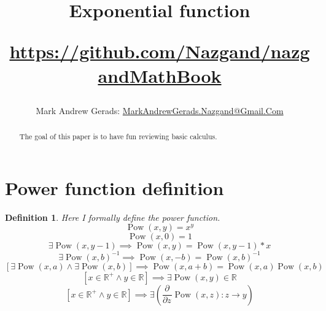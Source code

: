 \documentclass[]{article}
\author{Mark Andrew Gerads: \href{MailTo:MarkAndrewGerads.Nazgand@Gmail.Com}{MarkAndrewGerads.Nazgand@Gmail.Com}}
\title{
	Exponential function
	
	\href{https://github.com/Nazgand/nazgandMathBook}{https://github.com/Nazgand/nazgandMathBook}
}
\DeclareMathOperator{\pow}{Pow}
\newcommand{\pqty}[1]{{\left(#1\right)}}
\newcommand{\bqty}[1]{{\left[#1\right]}}
\newcommand{\pdiff}[2]{\frac{\partial^{#2}}{\partial #1^{#2}}}
\newtheorem{definition}[theorem]{Definition}
\numberwithin{equation}{section}
\begin{document}
	
	\maketitle
	
	\begin{abstract}
		The goal of this paper is to have fun reviewing basic calculus.
	\end{abstract}
	
	\section{Power function definition}
	\begin{definition}
			Here I formally define the power function.
		\begin{equation}
			\pow\pqty{x,y}=x^y
		\end{equation}
		\begin{equation}
			\pow\pqty{x,0}=1
		\end{equation}
		\begin{equation}
			\exists\pow\pqty{x,y-1}\implies\pow\pqty{x,y}=\pow\pqty{x,y-1}*x
		\end{equation}
		\begin{equation}
			{\exists\pow\pqty{x,b}^{-1}}\implies\pow\pqty{x,-b}=\pow\pqty{x,b}^{-1}
		\end{equation}
		\begin{equation}
			\bqty{\exists\pow\pqty{x,a}\land\exists\pow\pqty{x,b}}\implies\pow\pqty{x,a+b}=\pow\pqty{x,a}\pow\pqty{x,b}
		\end{equation}
		\begin{equation}
			\bqty{x\in\mathbb{R}^+ \land y\in\mathbb{R}}\implies\exists\pow\pqty{x,y}\in\mathbb{R}
		\end{equation}
		\begin{equation}
			\bqty{x\in\mathbb{R}^+\land y\in\mathbb{R}}
			\implies\exists\pqty{\pdiff{z}{}\pow\pqty{x,z}:z\to y}
		\end{equation}
	\end{definition}
	
\end{document}
